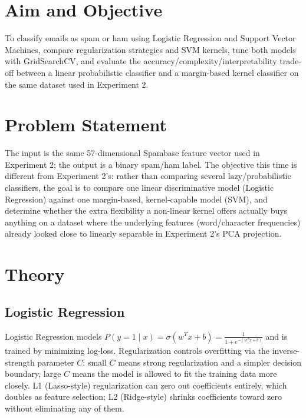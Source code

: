 \documentclass[11pt,a4paper]{article}
\begin{document}
\section{Aim and Objective}
To classify emails as spam or ham using Logistic Regression and Support Vector Machines, compare regularization strategies and SVM kernels, tune both models with GridSearchCV, and evaluate the accuracy/complexity/interpretability trade-off between a linear probabilistic classifier and a margin-based kernel classifier on the same dataset used in Experiment 2.

\section{Problem Statement}
The input is the same 57-dimensional Spambase feature vector used in Experiment 2; the output is a binary spam/ham label. The objective this time is different from Experiment 2's: rather than comparing several lazy/probabilistic classifiers, the goal is to compare one linear discriminative model (Logistic Regression) against one margin-based, kernel-capable model (SVM), and determine whether the extra flexibility a non-linear kernel offers actually buys anything on a dataset where the underlying features (word/character frequencies) already looked close to linearly separable in Experiment 2's PCA projection.

\section{Theory}

\subsection{Logistic Regression}
Logistic Regression models $P(y=1\mid x) = \sigma(w^Tx + b) = \frac{1}{1+e^{-(w^Tx+b)}}$ and is trained by minimizing log-loss. Regularization controls overfitting via the inverse-strength parameter $C$: small $C$ means strong regularization and a simpler decision boundary, large $C$ means the model is allowed to fit the training data more closely. L1 (Lasso-style) regularization can zero out coefficients entirely, which doubles as feature selection; L2 (Ridge-style) shrinks coefficients toward zero without eliminating any of them.
\end{document}
